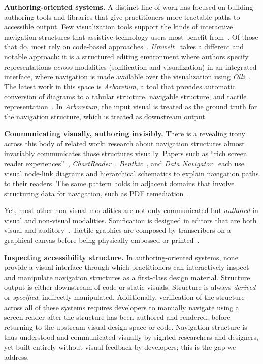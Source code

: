 \documentclass[12pt]{cmuthesis}
\begin{document}
\textbf{Authoring-oriented systems.} A distinct line of work has focused on building authoring tools and libraries that give practitioners more tractable paths to accessible output. Few visualization tools support the kinds of interactive navigation structures that assistive technology users most benefit from~\cite{Kim2023Beyond}. Of those that do, most rely on code-based approaches~\cite{Blanco2022olli,Sharif2018evoGraphs,Sharif2022VoxLens,Elavsky2023}. \textit{Umwelt}~\cite{Zong2024} takes a different and notable approach: it is a structured editing environment where authors specify representations \textit{across} modalities (sonification and visualization) in an integrated interface, where navigation is made available over the visualization using \textit{Olli}~\cite{Blanco2022olli}. The latest work in this space is \textit{Arboretum}, a tool that provides automatic conversion of diagrams to a tabular structure, navigable structure, and tactile representation~\cite{Wimer2026}. In \textit{Arboretum}, the input visual is treated as the ground truth for the navigation structure, which is treated as downstream output.

\textbf{Communicating visually, authoring invisibly.} There is a revealing irony across this body of related work: research about navigation structures almost invariably communicates those structures visually. Papers such as ``rich screen reader experiences''~\cite{Zong2022Rich}, \textit{ChartReader}~\cite{Thompson2023Chart}, \textit{Benthic}~\cite{Mei2025}, and \textit{Data Navigator}~\cite{Elavsky2023} each use visual node-link diagrams and hierarchical schematics to explain navigation paths to their readers. The same pattern holds in adjacent domains that involve structuring data for navigation, such as PDF remediation~\cite{Mowar2026iTagPDF}.

Yet, most other non-visual modalities are not only communicated but \textit{authored} in visual and non-visual modalities. Sonification is designed in editors that are both visual and auditory~\cite{Kim2024}. Tactile graphics are composed by transcribers on a graphical canvas before being physically embossed or printed~\cite{Bornschein2015Collaborative}.

\textbf{Inspecting accessibility structure.} In authoring-oriented systems, none provide a visual interface through which practitioners can interactively inspect and manipulate navigation structures as a first-class design material. Structure output is either downstream of code or static visuals. Structure is always \textit{derived} or \textit{specified}; indirectly manipulated. Additionally, verification of the structure across all of these systems requires developers to manually navigate using a screen reader after the structure has been authored and rendered, before returning to the upstream visual design space or code. Navigation structure is thus understood and communicated visually by sighted researchers and designers, yet built entirely without visual feedback by developers; this is the gap we address.
\end{document}
